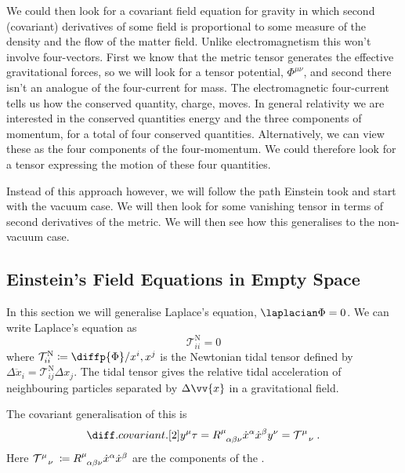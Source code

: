 \documentclass[fleqn]{NotesClass}
\begin{document}
    We could then look for a covariant field equation for gravity in which second (covariant) derivatives of some field is proportional to some measure of the density and the flow of the matter field.
    Unlike electromagnetism this won't involve four-vectors.
    First we know that the metric tensor generates the effective gravitational forces, so we will look for a tensor potential, \(\Phi^{\mu\nu}\), and second there isn't an analogue of the four-current for mass.
    The electromagnetic four-current tells us how the conserved quantity, charge, moves.
    In general relativity we are interested in the conserved quantities energy and the three components of momentum, for a total of four conserved quantities.
    Alternatively, we can view these as the four components of the four-momentum.
    We could therefore look for a tensor expressing the motion of these four quantities.
    
    Instead of this approach however, we will follow the path Einstein took and start with the vacuum case.
    We will then look for some vanishing tensor in terms of second derivatives of the metric.
    We will then see how this generalises to the non-vacuum case.
    
    \subsection{Einstein's Field Equations in Empty Space}
    In this section we will generalise Laplace's equation, \(\laplacian\Phi = 0\).
    We can write Laplace's equation as
    \begin{equation}
        \mathcal{T}^{\mathrm{N}}_{ii} = 0
    \end{equation}
    where \(\mathcal{T}^{\mathrm{N}}_{ii} \coloneqq \diffp{\Phi}/{x^i, x^j}\) is the Newtonian tidal tensor defined by \(\Delta \ddot{x}_i = \mathcal{T}^{\mathrm{N}}_{ij} \Delta x_j\).
    The tidal tensor gives the relative tidal acceleration of neighbouring particles separated by \(\Delta \vv{x}\) in a gravitational field.
    
    The covariant generalisation of this is
    \begin{equation}
        \diffcov[2]{y^\mu}{\tau} = \tensor{R}{^\mu_{\alpha\beta\nu}} \dot{x}^\alpha \dot{x}^\beta y^\nu = \tensor{\mathcal{T}}{^\mu_{\mkern8mu\nu}}.
    \end{equation}
    Here \(\tensor{\mathcal{T}}{^\mu_{\mkern8mu\nu}} \coloneqq \tensor{R}{^\mu_{\alpha\beta\nu}}\dot{x}^\alpha\dot{x}^\beta\) are the components of the .
    
\end{document}
